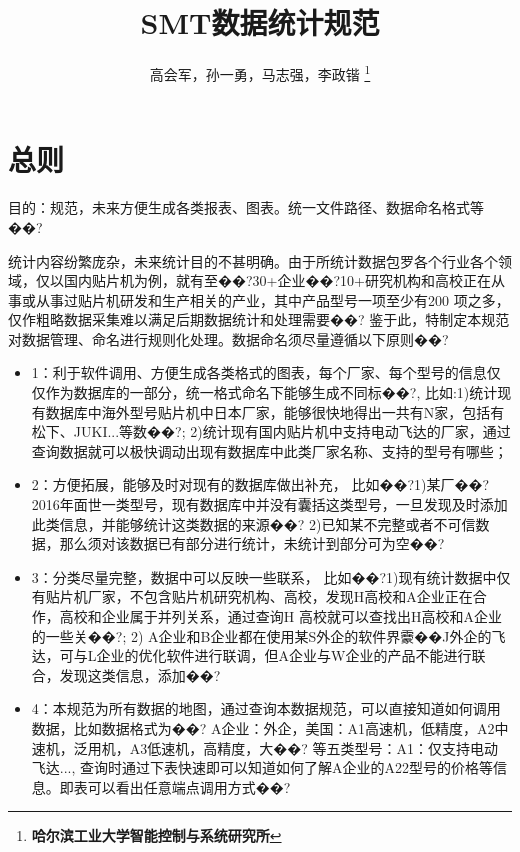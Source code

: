 \documentclass[a4paper,12pt]{article}
\begin{document}
\title{SMT数据统计规范}
\author{高会军，孙一勇，马志强，李政锴
\thanks{\textbf{哈尔滨工业大学智能控制与系统研究所}}
\date{\CurrentDate} %
}
\maketitle


\section{总则}
目的：规范，未来方便生成各类报表、图表。统一文件路径、数据命名格式等��?

统计内容纷繁庞杂，未来统计目的不甚明确。由于所统计数据包罗各个行业各个领域，仅以国内贴片机为例，就有至��?30+企业��?10+研究机构和高校正在从事或从事过贴片机研发和生产相关的产业，其中产品型号一项至少有200 项之多，仅作粗略数据采集难以满足后期数据统计和处理需要��? 鉴于此，特制定本规范对数据管理、命名进行规则化处理。数据命名须尽量遵循以下原则��?
\begin{itemize}
  \item 1：利于软件调用、方便生成各类格式的图表，每个厂家、每个型号的信息仅仅作为数据库的一部分，统一格式命名下能够生成不同标��?,
       比如:1)统计现有数据库中海外型号贴片机中日本厂家，能够很快地得出一共有N家，包括有松下、JUKI...等数��?; 2)统计现有国内贴片机中支持电动飞达的厂家，通过查询数据就可以极快调动出现有数据库中此类厂家名称、支持的型号有哪些；
  \item 2：方便拓展，能够及时对现有的数据库做出补充，
        比如��?1)某厂��?2016年面世一类型号，现有数据库中并没有囊括这类型号，一旦发现及时添加此类信息，并能够统计这类数据的来源��? 2)已知某不完整或者不可信数据，那么须对该数据已有部分进行统计，未统计到部分可为空��?
  \item 3：分类尽量完整，数据中可以反映一些联系，
        比如��?1)现有统计数据中仅有贴片机厂家，不包含贴片机研究机构、高校，发现H高校和A企业正在合作，高校和企业属于并列关系，通过查询H 高校就可以查找出H高校和A企业的一些关��?; 2) A企业和B企业都在使用某S外企的软件界靀��J外企的飞达，可与L企业的优化软件进行联调，但A企业与W企业的产品不能进行联合，发现这类信息，添加��?
  \item 4：本规范为所有数据的地图，通过查询本数据规范，可以直接知道如何调用数据，比如数据格式为��? A企业：外企，美国：A1高速机，低精度，A2中速机，泛用机，A3低速机，高精度，大��? 等五类型号：A1：仅支持电动飞达..., 查询时通过下表快速即可以知道如何了解A企业的A22型号的价格等信息。即表可以看出任意端点调用方式��?
\end{itemize}
\end{document}
